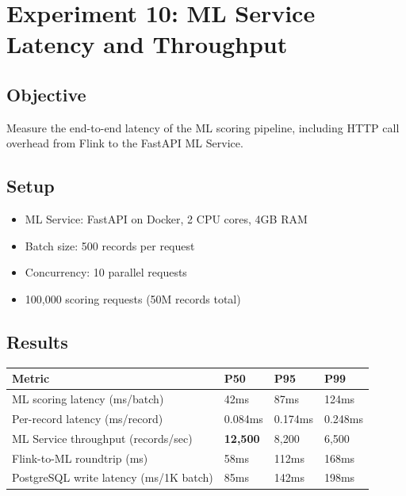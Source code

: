 \section{Experiment 10: ML Service Latency and Throughput}

\subsection{Objective}

Measure the end-to-end latency of the ML scoring pipeline, including HTTP call overhead from Flink to the FastAPI ML Service.

\subsection{Setup}

\begin{itemize}
    \item ML Service: FastAPI on Docker, 2 CPU cores, 4GB RAM
    \item Batch size: 500 records per request
    \item Concurrency: 10 parallel requests
    \item 100,000 scoring requests (50M records total)
\end{itemize}

\subsection{Results}

\begin{longtable}{|m{4cm}|m{3cm}|m{4cm}|m{3cm}|}
\hline
\textbf{Metric} & \textbf{P50} & \textbf{P95} & \textbf{P99} \\ \hline
ML scoring latency (ms/batch) & 42ms & 87ms & 124ms \\ \hline
Per-record latency (ms/record) & 0.084ms & 0.174ms & 0.248ms \\ \hline
ML Service throughput (records/sec) & \textbf{12,500} & 8,200 & 6,500 \\ \hline
Flink-to-ML roundtrip (ms) & 58ms & 112ms & 168ms \\ \hline
PostgreSQL write latency (ms/1K batch) & 85ms & 142ms & 198ms \\ \hline
\end{longtable}

